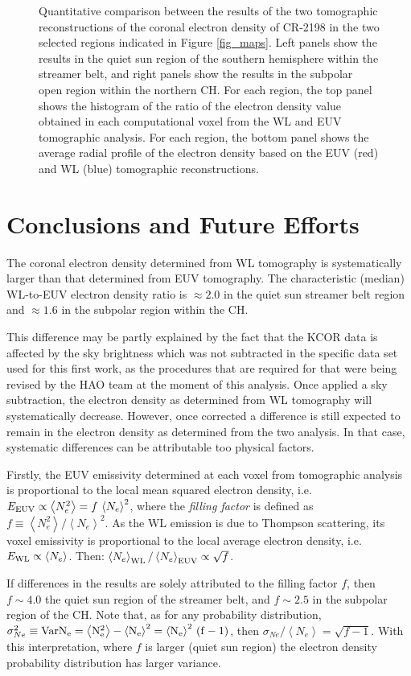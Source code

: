 \documentclass[baaa]{baaa}
\def\Eeuv{E_{\rm{EUV}}}
\def\Ewl{E_{\rm{WL}}}
\def\AvgNE2{\left<N_e^2\right>}
\def\AvgNe{\left<N_e\right>}
\def\SigmaNe{\sigma_{Ne}}
\begin{document}
\begin{figure}[h!]
  \caption{Quantitative comparison between the results of the two tomographic reconstructions of the coronal electron density of CR-2198 in the two selected regions indicated in Figure \ref{fig_maps}. Left panels show the results in the quiet sun region of the southern hemisphere within the streamer belt, and right panels show the results in the subpolar open region within the northern CH. For each region, the top panel shows the histogram of the ratio of the electron density value obtained in each computational voxel from the WL and EUV tomographic analysis. For each region, the bottom panel shows the average radial profile of the electron density based on the EUV (red) and WL (blue) tomographic reconstructions.}
  \label{fig_analysis}
\end{figure}

\section{Conclusions and Future Efforts}

The coronal electron density determined from WL tomography is systematically larger than that determined from EUV tomography. The characteristic (median) WL-to-EUV electron density ratio is $\approx 2.0$ in the quiet sun streamer belt region and $\approx 1.6$ in the subpolar region within the CH.

This difference may be partly explained by the fact that the KCOR data is affected by the sky brightness which was not subtracted in the specific data set used for this first work, as the procedures that are required for that were being revised by the HAO team at the moment of this analysis. Once applied a sky subtraction, the electron density as determined from WL tomography will systematically decrease. However, once corrected a difference is still expected to remain in the electron density as determined from the two analysis. In that case, systematic differences can be attributable too physical factors. 

Firstly, the EUV emissivity determined at each voxel from tomographic analysis is proportional to the local mean squared electron density, i.e. $\Eeuv \propto \AvgNE2 = f\,\AvgNe^2$, where the \emph{filling factor} is defined as $f\equiv\AvgNE2 / \AvgNe^2$. As the WL emission is due to Thompson scattering, its voxel emissivity is proportional to the local average electron density, i.e. $\Ewl \propto \AvgNe$. Then: $\AvgNe_{\rm{WL}} / \AvgNe_{\rm{EUV}} \propto \sqrt{f}$. 

If differences in the results are solely attributed to the filling factor $f$, then $f\sim 4.0$ the quiet sun region of the streamer belt, and $f\sim 2.5$ in the subpolar region of the CH. Note that, as for any probability distribution, $\SigmaNe^2 \equiv \rm{Var}N_e = \AvgNE2 - \AvgNe^2 = \AvgNe^2 \, (f-1)$, then $\SigmaNe / \AvgNe = \sqrt{f-1}$. With this interpretation, where $f$ is larger (quiet sun region) the electron density probability distribution has larger variance.
\end{document}
